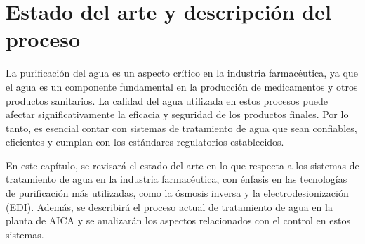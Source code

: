\chapter{Estado del arte y descripción del proceso}
La purificación del agua es un aspecto crítico en la industria farmacéutica, ya que el agua es un componente
fundamental en la producción de medicamentos y otros productos sanitarios. La calidad del agua utilizada
en estos procesos puede afectar significativamente la eficacia y seguridad de los productos finales.
Por lo tanto, es esencial contar con sistemas de tratamiento de agua que sean confiables, eficientes y cumplan con los estándares regulatorios establecidos.

En este capítulo, se revisará el estado del arte en lo que respecta a los sistemas de tratamiento de
agua en la industria farmacéutica, con énfasis en las tecnologías de purificación más utilizadas, como la ósmosis inversa y la electrodesionización (EDI). Además,
se describirá el proceso actual de tratamiento de agua en la planta de AICA y se analizarán los aspectos relacionados con el control en estos sistemas.


